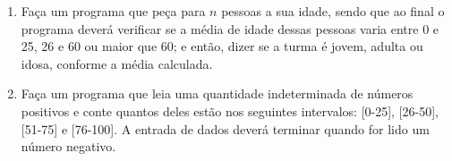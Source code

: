 \documentclass[12pt,a4paper]{article}
\begin{document}
\begin{enumerate}
  \item Faça um programa que peça para $n$ pessoas a sua idade, sendo que ao final o programa
  deverá verificar se a média de idade dessas pessoas varia entre 0 e 25, 26 e 60 ou maior que 60;
  e então, dizer se a turma é jovem, adulta ou idosa, conforme a média calculada.
  
  \item Faça um programa que leia uma quantidade indeterminada de números positivos e conte
  quantos deles estão nos seguintes intervalos: [0-25], [26-50], [51-75] e [76-100].
  A entrada de dados deverá terminar quando for lido um número negativo.
\end{enumerate}
\end{document}
